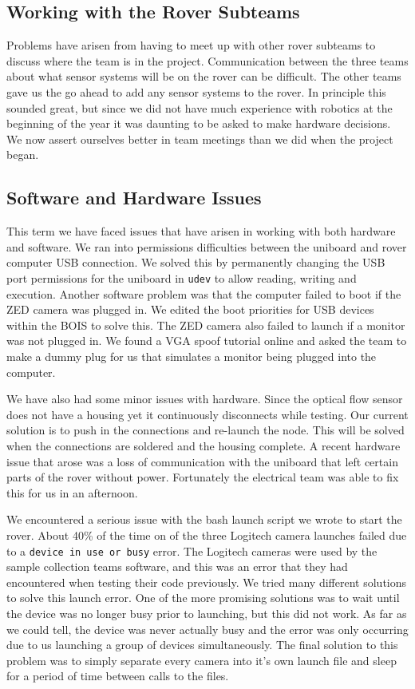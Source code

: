 \documentclass[10pt, oneside,onecolumn]{IEEEtran}
\begin{document}
\subsection{Working with the Rover Subteams}
Problems have arisen from having to meet up with other rover subteams to discuss where the team is in the project. Communication between the three teams about what sensor systems will be on the rover can be difficult. The other teams gave us the go ahead to add any sensor systems to the rover. In principle this sounded great, but since we did not have much experience with robotics at the beginning of the year it was daunting to be asked to make hardware decisions. We now assert ourselves better in team meetings than we did when the project began.

\subsection{Software and Hardware Issues}
This term we have faced issues that have arisen in working with both hardware and software. We ran into permissions difficulties between the uniboard and rover computer USB connection. We solved this by permanently changing the USB port permissions for the uniboard in \texttt{udev} to allow reading, writing and execution. Another software problem was that the computer failed to boot if the ZED camera was plugged in. We edited the boot priorities for USB devices within the BOIS to solve this. The ZED camera also failed to launch if a monitor was not plugged in. We found a VGA spoof tutorial online and asked the team to make a dummy plug for us that simulates a monitor being plugged into the computer.

We have also had some minor issues with hardware. Since the optical flow sensor does not have a housing yet it continuously disconnects while testing. Our current solution is to push in the connections and re-launch the node. This will be solved when the connections are soldered and the housing complete. A recent hardware issue that arose was a loss of communication with the uniboard that left certain parts of the rover without power. Fortunately the electrical team was able to fix this for us in an afternoon.

 We encountered a serious issue with the bash launch script we wrote to start the rover. About 40\% of the time on of the three Logitech camera launches failed due to a \texttt{device in use or busy} error. The Logitech cameras were used by the sample collection teams software, and this was an error that they had encountered when testing their code previously. We tried many different solutions to solve this launch error. One of the more promising solutions was to wait until the device was no longer busy prior to launching, but this did not work. As far as we could tell, the device was never actually busy and the error was only occurring due to us launching a group of devices simultaneously. The final solution to this problem was to simply separate every camera into it's own launch file and sleep for a period of time between calls to the files. 
\end{document}
